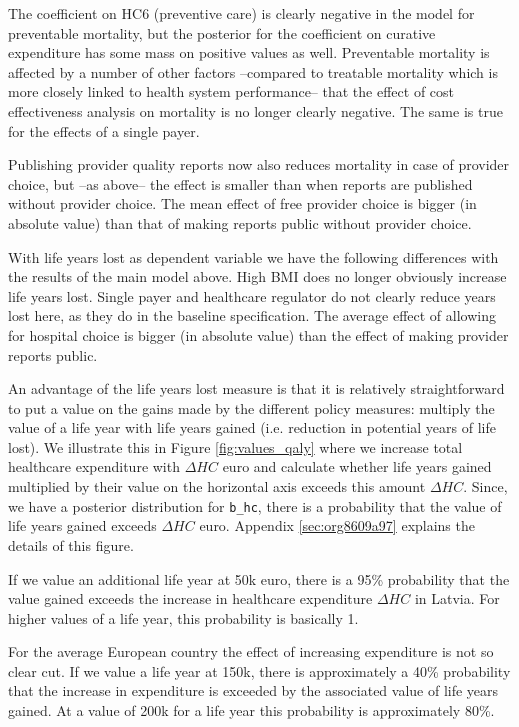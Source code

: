 \documentclass[a4paper,12pt]{article}
\begin{document}
The coefficient on HC6 (preventive care) is clearly negative in the model for preventable mortality, but the posterior for the coefficient on curative expenditure has some mass on positive values as well. Preventable mortality is affected by a number of other factors --compared to treatable mortality which is more closely linked to health system performance-- that the effect of cost effectiveness analysis on mortality is no longer clearly negative. The same is true for the effects of a single payer.

Publishing provider quality reports now also reduces mortality in case of provider choice, but --as above-- the effect is smaller than when reports are published without provider choice. The mean effect of free provider choice is bigger (in absolute value) than that of making reports public without provider choice.

With life years lost as dependent variable we have the following differences with the results of the main model above. High BMI does no longer obviously increase life years lost. Single payer and healthcare regulator do not clearly reduce years lost here, as they do in the baseline specification. The average effect of allowing for hospital choice is bigger (in absolute value) than the effect of making provider reports public.

An advantage of the life years lost measure is that it is relatively straightforward to put a value on the gains made by the different policy measures: multiply the value of a life year with life years gained (i.e. reduction in potential years of life lost). We illustrate this in Figure \ref{fig:values_qaly} where we increase total healthcare expenditure with \(\Delta HC\) euro and calculate whether life years gained multiplied by their value on the horizontal axis exceeds this amount \(\Delta HC\). Since, we have a posterior distribution for \texttt{b\_hc}, there is a probability that the value of life years gained exceeds \(\Delta HC\) euro. Appendix \ref{sec:org8609a97} explains the details of this figure.

If we value an additional life year at 50k euro, there is a 95\% probability that the value gained exceeds the increase in healthcare expenditure \(\Delta HC\) in Latvia. For higher values of a life year, this probability is basically 1.

For the average European country the effect of increasing expenditure is not so clear cut. If we value a life year at 150k, there is approximately a 40\% probability that the increase in expenditure is exceeded by the associated value of life years gained. At a value of 200k for a life year this probability is approximately 80\%.
\end{document}
